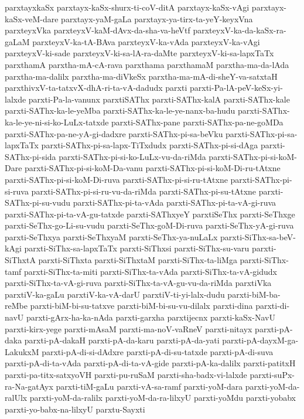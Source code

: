 {parxtayxkaSx
parxtayx-kaSx-shurx-ti-coV-ditA
parxtayx-kaSx-vAgi
parxtayx-kaSx-veM-dare
parxtayx-yaM-gaLa
parxtayx-ya-tirx-ta-yeY-keyxVna
parxteyxVka
parxteyxV-kaM-dAvx-da-sha-va-heVtf
parxteyxV-ka-da-kaSx-ra-gaLaM
parxteyxV-ka-tA-BAva
parxteyxV-ka-vAda
parxteyxV-ka-vAgi
parxteyxV-ki-sade
parxteyxV-ki-sa-lA-ra-daMte
parxteyxV-ki-sa-lapxTaTx
parxthamA
parxtha-mA-cA-rava
parxthama
parxthamaM
parxtha-ma-da-lAda
parxtha-ma-dalilx
parxtha-ma-diVkeSx
parxtha-ma-mA-di-sheY-va-satxtaH
parxthivxV-ta-tatxvX-dhA-ri-ta-vA-dadudx
parxti
parxti-Pa-lA-peV-keSx-yi-lalxde
parxti-Pa-la-vanunx
parxtiSAThx
parxti-SAThx-kalA
parxti-SAThx-kale
parxti-SAThx-ka-le-yeMba
parxti-SAThx-ka-le-ye-nanx-ba-hudu
parxti-SAThx-ka-le-ye-ni-si-ko-LuLx-tatxde
parxti-SAThx-pane
parxti-SAThx-pa-ne-goMDa
parxti-SAThx-pa-ne-yA-gi-dadxre
parxti-SAThx-pi-sa-beVku
parxti-SAThx-pi-sa-lapxTaTx
parxti-SAThx-pi-sa-lapx-TiTxdudx
parxti-SAThx-pi-si-dAga
parxti-SAThx-pi-sida
parxti-SAThx-pi-si-ko-LuLx-vu-da-riMda
parxti-SAThx-pi-si-koM-Dare
parxti-SAThx-pi-si-koM-Da-vanu
parxti-SAThx-pi-si-koM-Di-ru-tAtxne
parxti-SAThx-pi-si-koM-Di-ruva
parxti-SAThx-pi-si-ru-tAtxne
parxti-SAThx-pi-si-ruva
parxti-SAThx-pi-si-ru-vu-da-riMda
parxti-SAThx-pi-su-tAtxne
parxti-SAThx-pi-su-vudu
parxti-SAThx-pi-ta-vAda
parxti-SAThx-pi-ta-vA-gi-ruva
parxti-SAThx-pi-ta-vA-gu-tatxde
parxti-SAThxyeY
parxtiSeThx
parxti-SeThxge
parxti-SeThx-go-Li-su-vudu
parxti-SeThx-goM-Di-ruva
parxti-SeThx-yA-gi-ruva
parxti-SeThxya
parxti-SeThxyaM
parxti-SeThx-ya-nuLaLx
parxti-SiThx-sa-beV-kAgi
parxti-SiThx-sa-lapxTaTx
parxti-SiThxsi
parxti-SiThx-su-varu
parxti-SiThxtA
parxti-SiThxta
parxti-SiThxtaM
parxti-SiThx-ta-liMga
parxti-SiThx-tamf
parxti-SiThx-ta-miti
parxti-SiThx-ta-vAda
parxti-SiThx-ta-vA-gidudx
parxti-SiThx-ta-vA-gi-ruva
parxti-SiThx-ta-vA-gu-vu-da-riMda
parxtiVka
parxtiV-ka-gaLu
parxtiV-ka-vA-darU
parxtiV-ti-yi-lalx-dudu
parxti-biM-ba-reMbe
parxti-biM-bi-su-tatxve
parxti-biM-bi-su-vu-dilalx
parxti-dina
parxti-di-navU
parxti-gArx-ha-ka-nAda
parxti-garxha
parxtijecnx
parxti-kaSx-NavU
parxti-kirx-yege
parxti-mAsaM
parxti-ma-noV-vaRneV
parxti-nitayx
parxti-pA-daka
parxti-pA-dakaH
parxti-pA-da-karu
parxti-pA-da-yati
parxti-pA-dayxM-ga-LakukxM
parxti-pA-di-si-dAdxre
parxti-pA-di-su-tatxde
parxti-pA-di-suva
parxti-pA-di-ta-vAda
parxti-pA-di-ta-vA-gide
parxti-pA-ka-dalilx
parxti-patitxH
parxti-pa-titx-satxyoVH
parxti-pu-ruSaM
parxti-sha-badx-vi-lalxde
parxti-suPx-ra-Na-gatAyx
parxti-tiM-gaLu
parxti-vA-sa-ramf
parxti-yoM-dara
parxti-yoM-da-ralUlx
parxti-yoM-da-ralilx
parxti-yoM-da-ra-lilxyU
parxti-yoMdu
parxti-yobabx
parxti-yo-babx-na-lilxyU
parxtu-Sayxti
}
